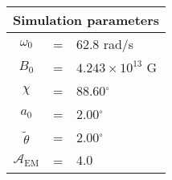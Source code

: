  \begin{tabular}{ccl}
\multicolumn{3}{c}{Simulation parameters} \\
\hline
$\omega_0$  &=& 62.8 rad/s\\
$B_0$  &=& $ 4.243\times 10^{13} $ G \\
$\chi$  &=& 88.60$^{\circ}$ \\
$a_0$ &=& 2.00$^{\circ}$ \\
$\tilde{\theta}$ &= & 2.00$^{\circ}$ \\
$\mathcal{A}_{\mathrm{EM}}$ &= & $4.0$
\end{tabular}
    
